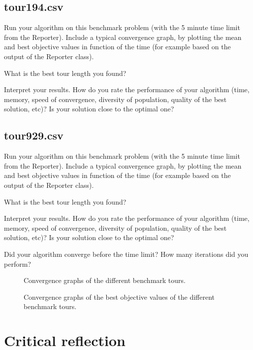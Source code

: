 \documentclass[a4paper,10pt]{article}
\newcommand{\ReplaceMe}[1]{{\color{blue}#1}}
\begin{document}
\subsection{tour194.csv}

\ReplaceMe{Run your algorithm on this benchmark problem (with the 5 minute time limit from the Reporter). Include a typical convergence graph, by plotting the mean and best objective values in function of the time (for example based on the output of the Reporter class). 

What is the best tour length you found? 

Interpret your results. How do you rate the performance of your algorithm (time, memory, speed of convergence, diversity of population, quality of the best solution, etc)? Is your solution close to the optimal one?}

\subsection{tour929.csv}

\ReplaceMe{Run your algorithm on this benchmark problem (with the 5 minute time limit from the Reporter). Include a typical convergence graph, by plotting the mean and best objective values in function of the time (for example based on the output of the Reporter class). 

What is the best tour length you found? 

Interpret your results. How do you rate the performance of your algorithm (time, memory, speed of convergence, diversity of population, quality of the best solution, etc)? Is your solution close to the optimal one? 

Did your algorithm converge before the time limit? How many iterations did you perform?}

\begin{figure}
\centering
{}
\caption{Convergence graphs of the different benchmark tours.}
\label{fig:graphs}
\end{figure}

\begin{figure}
\centering
{}
\caption{Convergence graphs of the best objective values of the different benchmark tours.}
\label{fig:graphs}
\end{figure}

\section{Critical reflection}
\end{document}
